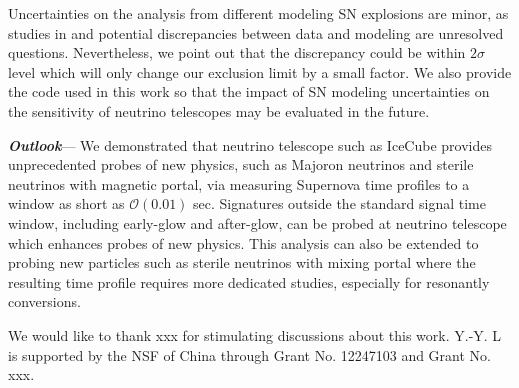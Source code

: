 Uncertainties on the analysis from different modeling SN explosions are minor, as studies in \cite{li2023old} and potential discrepancies between data and modeling are unresolved questions.
Nevertheless, we point out that the discrepancy could be within $2\sigma$ level which will only change our exclusion limit by a small factor.
We also provide the code used in this work so that the impact of SN modeling uncertainties on the sensitivity of neutrino telescopes may be evaluated in the future.

\textbf{\textit{Outlook}}---
We demonstrated that neutrino telescope such as IceCube provides unprecedented probes of new physics, such as Majoron neutrinos and sterile neutrinos with magnetic portal, via measuring Supernova time profiles to a window as short as $\mathcal{O}(0.01)$ sec. Signatures outside the standard signal time window, including early-glow and after-glow, can be probed at neutrino telescope which enhances probes of new physics.
This analysis can also be extended to probing new particles such as sterile neutrinos with mixing portal where the resulting time profile requires more dedicated studies, especially for resonantly conversions. 

\begin{acknowledgments}
We would like to thank xxx for stimulating discussions about this work. Y.-Y. L is supported by the NSF of China through Grant
No. 12247103 and Grant No. xxx.
\end{acknowledgments}
